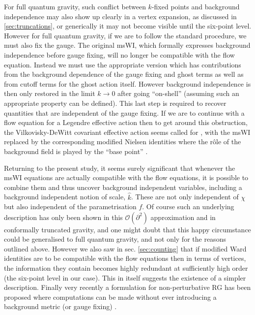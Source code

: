 \documentclass[11pt]{book} %
\newcommand{\hk}{\hat k}
\numberwithin{equation}{chapter}
\begin{document}
{For full quantum gravity, such conflict between $k$-fixed points and background independence may also
show up clearly in a vertex expansion, as discussed in \ref{sec:truncations},
or generically it may not become visible until the six-point level.
However for full quantum gravity, if we are to follow the standard procedure, we must also fix the gauge.
The original msWI, which formally expresses background independence before gauge fixing,
will no longer be compatible with the flow equation.
Instead we must use the appropriate version which has contributions from the background dependence of
the gauge fixing and ghost terms as well as from cutoff terms for the ghost action itself.
However background independence is then only restored in the limit $k\to0$ after going ``on-shell''
(assuming such an appropriate property can be defined).
This last step is required to recover quantities that are independent of the gauge fixing.
If we are to continue with a flow equation for a Legendre effective action
\cite{Wetterich:1992yh,Morris:1993qb} then to get around this obstruction,
the Vilkovisky-DeWitt covariant effective action seems called for
\cite{Branchina:2003ek,Donkin:2012ud,Demmel:2014hla,Safari:2015dva},
with the msWI replaced by the corresponding modified Nielsen identities where the r\^ole of the background
field is played by the ``base point'' \cite{Pawlowski:2003sk}.

Returning to the present study, it seems surely significant that
whenever the msWI equations  are actually compatible with the flow equations,
it is possible to combine them and thus uncover background independent variables,
including a background independent notion of scale, $\hk$.
These are not only independent of $\chi$ but also independent of the parametrisation $f$.
Of course such an underlying description has only been shown in this $\mathcal{O}(\partial^2)$ approximation and
in conformally truncated gravity, and one might doubt that this happy circumstance could be generalised to
full quantum gravity, and not only for the reasons outlined above.
However we also saw in sec. \ref{sec:counting} that if modified Ward identities are to be compatible with
the flow equations then in terms of vertices, the information they contain becomes highly redundant
at sufficiently high order (the six-point level in our case).
This in itself suggests the existence of a simpler description.
Finally very recently a formulation for non-perturbative RG has been proposed where computations can be
made without ever introducing a background metric (or gauge fixing) \cite{Morris:2016nda}.


}
\end{document}

